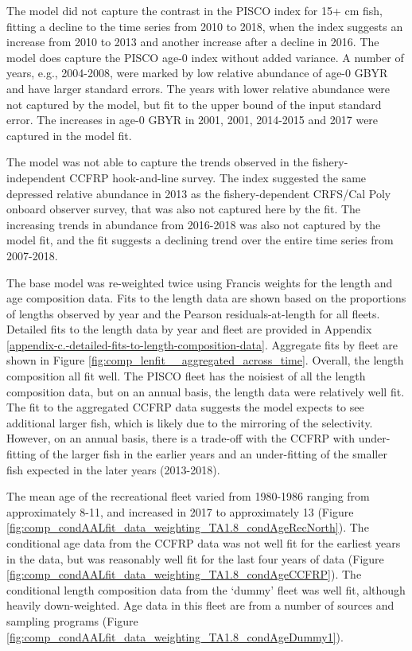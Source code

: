 \documentclass[12pt,]{article}
\begin{document}
The model did not capture the contrast in the PISCO index for 15+ cm
fish, fitting a decline to the time series from 2010 to 2018, when the
index suggests an increase from 2010 to 2013 and another increase after
a decline in 2016. The model does capture the PISCO age-0 index without
added variance. A number of years, e.g., 2004-2008, were marked by low
relative abundance of age-0 GBYR and have larger standard errors. The
years with lower relative abundance were not captured by the model, but
fit to the upper bound of the input standard error. The increases in
age-0 GBYR in 2001, 2001, 2014-2015 and 2017 were captured in the model
fit.

The model was not able to capture the trends observed in the
fishery-independent CCFRP hook-and-line survey. The index suggested the
same depressed relative abundance in 2013 as the fishery-dependent
CRFS/Cal Poly onboard observer survey, that was also not captured here
by the fit. The increasing trends in abundance from 2016-2018 was also
not captured by the model fit, and the fit suggests a declining trend
over the entire time series from 2007-2018.

The base model was re-weighted twice using Francis weights for the
length and age composition data. Fits to the length data are shown based
on the proportions of lengths observed by year and the Pearson
residuals-at-length for all fleets. Detailed fits to the length data by
year and fleet are provided in Appendix
\ref{appendix-c.-detailed-fits-to-length-composition-data}. Aggregate
fits by fleet are shown in Figure
\ref{fig:comp_lenfit__aggregated_across_time}. Overall, the length
composition all fit well. The PISCO fleet has the noisiest of all the
length composition data, but on an annual basis, the length data were
relatively well fit. The fit to the aggregated CCFRP data suggests the
model expects to see additional larger fish, which is likely due to the
mirroring of the selectivity. However, on an annual basis, there is a
trade-off with the CCFRP with under-fitting of the larger fish in the
earlier years and an under-fitting of the smaller fish expected in the
later years (2013-2018).

The mean age of the recreational fleet varied from 1980-1986 ranging
from approximately 8-11, and increased in 2017 to approximately 13
(Figure \ref{fig:comp_condAALfit_data_weighting_TA1.8_condAgeRecNorth}).
The conditional age data from the CCFRP data was not well fit for the
earliest years in the data, but was reasonably well fit for the last
four years of data (Figure
\ref{fig:comp_condAALfit_data_weighting_TA1.8_condAgeCCFRP}). The
conditional length composition data from the `dummy' fleet was well fit,
although heavily down-weighted. Age data in this fleet are from a number
of sources and sampling programs (Figure
\ref{fig:comp_condAALfit_data_weighting_TA1.8_condAgeDummy1}).
\end{document}
